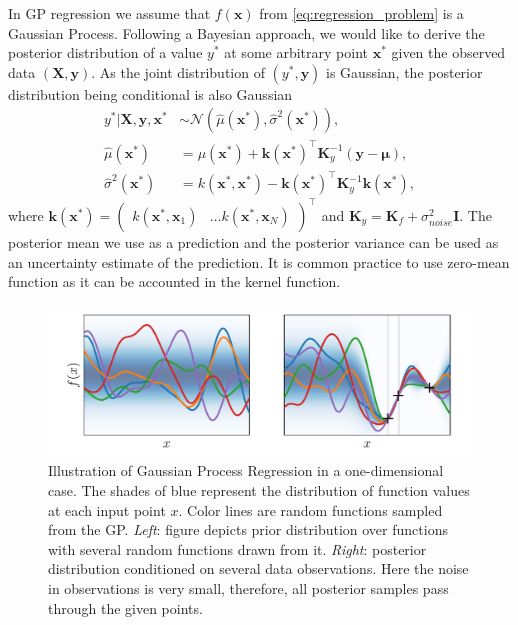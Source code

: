 In GP regression we assume that $f(\mathbf{x})$ from \eqref{eq:regression_problem}
is a Gaussian Process.
Following a Bayesian approach, we would like to derive the posterior distribution
of a value $y^*$ at some arbitrary point $\mathbf{x}^*$ given the observed data
$(\mathbf{X, y})$.
As the joint distribution of $(y^*, \mathbf{y})$ is Gaussian, the posterior
distribution being conditional is also Gaussian
\begin{equation}
\label{eq:gp_posterior}
    \begin{aligned}
        y^* | \mathbf{X}, \mathbf{y}, \mathbf{x}^* &\sim
        \mathcal{N}(\hat{\mu}(\mathbf{x}^*), \hat{\sigma}^2(\mathbf{x}^*)), \\
        \hat{\mu}(\mathbf{x}^*) &=
        \mu(\mathbf{x}^*) + \mathbf{k}(\mathbf{x}^*)^\top \mathbf{K}_y^{-1}
        (\mathbf{y} - \bm{\mu}), \\
        \hat{\sigma}^2(\mathbf{x}^*) &=
        k(\mathbf{x}^*, \mathbf{x}^*) -
        \mathbf{k}(\mathbf{x}^*)^\top \mathbf{K}_y^{-1} \mathbf{k}(\mathbf{x}^*),
    \end{aligned}
\end{equation}
where $\mathbf{k}(\mathbf{x}^*) = \begin{pmatrix}
k(\mathbf{x}^*, \mathbf{x}_1) & \ldots k(\mathbf{x}^*, \mathbf{x}_N)
\end{pmatrix}^\top$
and
$\mathbf{K}_y = \mathbf{K}_f + \sigma_{noise}^2 \mathbf{I}$.
The posterior mean we use as a prediction and the posterior variance
can be used as an uncertainty estimate of the prediction.
It is common practice to use zero-mean function as it can
be accounted in the kernel function.
\begin{figure}[h]
  \centering
  \includegraphics[width=\textwidth]{figures/intro/gp_intro.pdf}
  \caption{Illustration of Gaussian Process Regression in a one-dimensional case.
  The shades of blue represent the distribution of function values at each input point $x$.
  Color lines are random functions sampled from the GP.
  {\em Left}: figure depicts prior distribution over functions with several random
  functions drawn from it.
  {\em Right}: posterior distribution conditioned on several data observations.
  Here the noise in observations is very small, therefore, all posterior samples
  pass through the given points.
  }
  \label{fig:gp_intro}
\end{figure}

